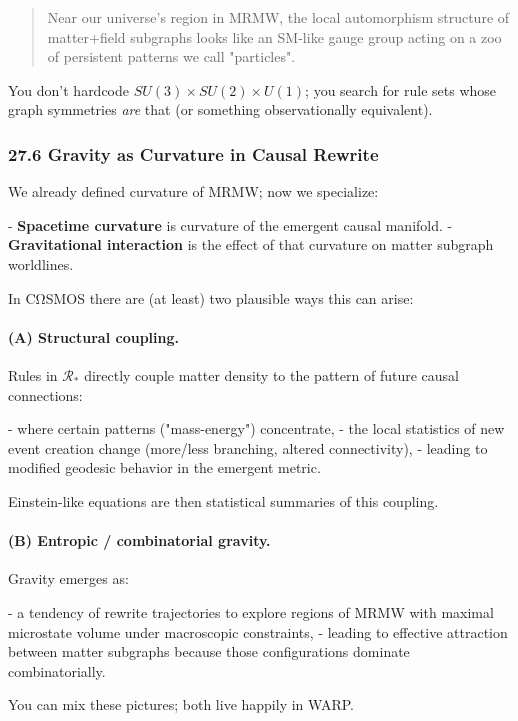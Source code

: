 \begin{quote}
Near our universe’s region in MRMW, the local automorphism structure of matter+field subgraphs looks like an SM-like gauge group acting on a zoo of persistent patterns we call "particles".
\end{quote}

You don’t hardcode $SU(3)\times SU(2)\times U(1)$; you search for rule sets whose graph symmetries \emph{are} that (or something observationally equivalent).

\subsubsection*{27.6  Gravity as Curvature in Causal Rewrite}

We already defined curvature of MRMW; now we specialize:

- \textbf{Spacetime curvature} is curvature of the emergent causal manifold.
- \textbf{Gravitational interaction} is the effect of that curvature on matter subgraph worldlines.

In CΩSMOS there are (at least) two plausible ways this can arise:

\paragraph{(A) Structural coupling.}

Rules in $\mathcal{R}_\ast$ directly couple matter density to the pattern of future causal connections:

- where certain patterns ("mass-energy") concentrate,
- the local statistics of new event creation change (more/less branching, altered connectivity),
- leading to modified geodesic behavior in the emergent metric.

Einstein-like equations are then statistical summaries of this coupling.

\paragraph{(B) Entropic / combinatorial gravity.}

Gravity emerges as:

- a tendency of rewrite trajectories to explore regions of MRMW with maximal microstate volume under macroscopic constraints,
- leading to effective attraction between matter subgraphs because those configurations dominate combinatorially.

You can mix these pictures; both live happily in WARP.

